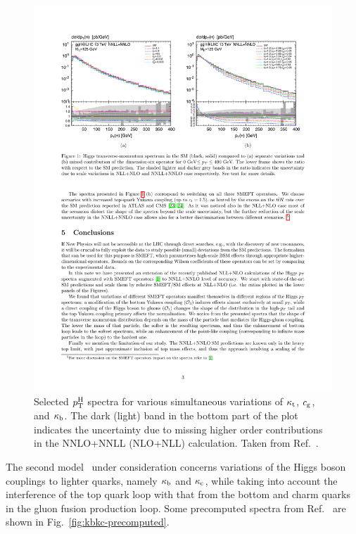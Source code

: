 \begin{figure}[hbtp]
  \begin{center}
    \includegraphics[width=0.6\linewidth]{img/theory/ktcgkb_variations.pdf}
    \caption{
        Selected $p_\mathrm{T}^\mathrm{H}$ spectra for various simultaneous variations of $\kappa_{\mathrm{t}}$, $c_\mathrm{g}$, and $\kappa_{\mathrm{b}}$.
        The dark (light) band in the bottom part of the plot indicates the uncertainty due to missing higher order contributions in the NNLO+NNLL (NLO+NLL) calculation.
        Taken from Ref.~\cite{Grazzini:2017szg}.
        }
    \label{fig:ktcgkb-precomputed}
  \end{center}
\end{figure}


The second model~\cite{Bishara:2016jga} under consideration concerns variations of the Higgs boson couplings to lighter quarks, namely $\kappa_{\mathrm{b}}$ and $\kappa_{\mathrm{c}}$, while taking into account the interference of the top quark loop with that from the bottom and charm quarks in the gluon fusion production loop.
% 
Some precomputed spectra from Ref.~\cite{Bishara:2016jga} are shown in Fig.~\ref{fig:kbkc-precomputed}.


